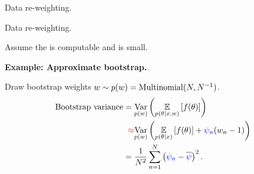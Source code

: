 \begin{frame}{Data re-weighting.}
%
\end{frame}



\begin{frame}[t]{Data re-weighting.}


Assume the  is computable and  is small.
%
\expansion{}


%
%

\pause
\textbf{Example: Approximate bootstrap.}

Draw bootstrap
weights $w \sim p(w) = \textrm{Multinomial}(N, N^{-1})$.
%
\begin{align*}
%
\textrm{Bootstrap variance} ={}&
\var{\p(\w)}{\expect{p(\theta \vert \x, w)}{f(\theta)}} 
\\\red{\approx}{}&
  \var{\p(\w)}{\expect{p(\theta \vert \x)}{f(\theta)} + \blue{\infl_n}(\w_n - 1)} 
\\={}& \frac{1}{N^2} \sumn \left(\blue{\infl_n} - \overline{\blue{\infl}}\right)^2.
%
\end{align*}
%



\end{frame}
